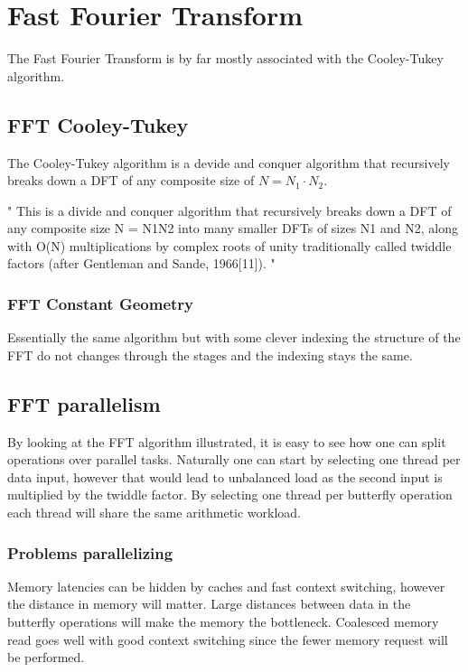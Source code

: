 \section{Fast Fourier Transform}

The Fast Fourier Transform is by far mostly associated with the Cooley-Tukey algorithm.

\subsection{FFT Cooley-Tukey}

The Cooley-Tukey algorithm is a devide and conquer algorithm that recursively breaks down a DFT of any composite size of $N = N_1{\cdot}N_2$.  

"
This is a divide and conquer algorithm that recursively breaks down a DFT of any composite size N = N1N2 into many smaller DFTs of sizes N1 and N2, along with O(N) multiplications by complex roots of unity traditionally called twiddle factors (after Gentleman and Sande, 1966[11]).
"

\subsubsection{FFT Constant Geometry}

Essentially the same algorithm but with some clever indexing the structure of the FFT do not changes through the stages and the indexing stays the same.

\subsection{FFT parallelism}

By looking at the FFT algorithm illustrated, it is easy to see how one can split operations over parallel tasks. Naturally one can start by selecting one thread per data input, however that would lead to unbalanced load as the second input is multiplied by the twiddle factor. By selecting one thread per butterfly operation each thread will share the same arithmetic workload.

\subsubsection{Problems parallelizing}

Memory latencies can be hidden by caches and fast context switching, however the distance in memory will matter. Large distances between data in the butterfly operations will make the memory the bottleneck. Coalesced memory read goes well with good context switching since the fewer memory request will be performed.